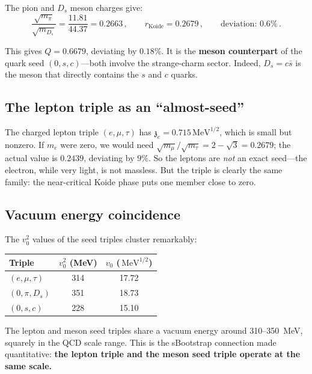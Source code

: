 \documentclass[12pt,a4paper]{article}
\newcommand{\MeV}{\,\text{MeV}}
\newcommand{\zch}{\mathfrak{z}}
\begin{document}
The pion and $D_s$ meson charges give:
\begin{equation}
\frac{\sqrt{m_\pi}}{\sqrt{m_{D_s}}} = \frac{11.81}{44.37} = 0.2663\,, 
\qquad r_{\text{Koide}} = 0.2679\,, \qquad \text{deviation: } 0.6\%\,.
\end{equation}

This gives $Q = 0.6679$, deviating by $0.18\%$. It is the 
\textbf{meson counterpart} of the quark seed $(0, s, c)$---both 
involve the strange-charm sector. Indeed, $D_s = c\bar{s}$ is the 
meson that directly contains the $s$ and $c$ quarks.

\subsection{The lepton triple as an ``almost-seed''}

The charged lepton triple $(e, \mu, \tau)$ has $\zch_e = 0.715\MeV^{1/2}$, 
which is small but nonzero. If $m_e$ were zero, we would need 
$\sqrt{m_\mu}/\sqrt{m_\tau} = 2 - \sqrt{3} = 0.2679$; the actual value 
is $0.2439$, deviating by $9\%$. So the leptons are \emph{not} an 
exact seed---the electron, while very light, is not massless. But the 
triple is clearly the same family: the near-critical Koide phase puts 
one member close to zero.

\subsection{Vacuum energy coincidence}

The $v_0^2$ values of the seed triples cluster remarkably:

\begin{center}
\begin{tabular}{lcc}
\toprule
Triple & $v_0^2$ (MeV) & $v_0$ ($\MeV^{1/2}$) \\
\midrule
$(e, \mu, \tau)$ & 314 & 17.72 \\
$(0, \pi, D_s)$ & 351 & 18.73 \\
$(0, s, c)$ & 228 & 15.10 \\
\bottomrule
\end{tabular}
\end{center}

The lepton and meson seed triples share a vacuum energy around 
310--350~MeV, squarely in the QCD scale range. This is the 
sBootstrap connection made quantitative: \textbf{the lepton triple 
and the meson seed triple operate at the same scale.}

\end{document}
